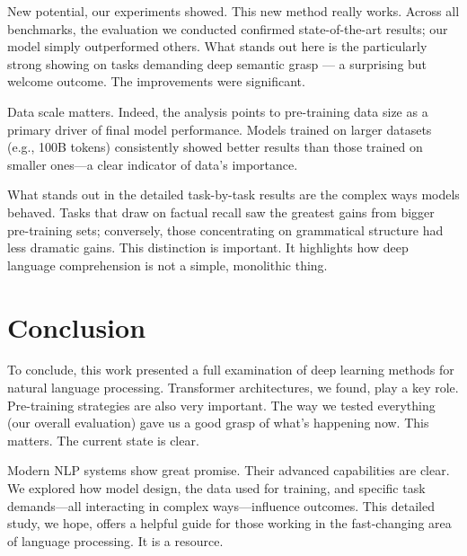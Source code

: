 \documentclass{article}
\begin{document}
New potential, our experiments showed. This new method really works. Across all benchmarks, the evaluation we conducted confirmed state-of-the-art results; our model simply outperformed others. What stands out here is the particularly strong showing on tasks demanding deep semantic grasp — a surprising but welcome outcome. The improvements were significant.

Data scale matters. Indeed, the analysis points to pre-training data size as a primary driver of final model performance. Models trained on larger datasets (e.g., 100B tokens) consistently showed better results than those trained on smaller ones—a clear indicator of data’s importance.

What stands out in the detailed task-by-task results are the complex ways models behaved. Tasks that draw on factual recall saw the greatest gains from bigger pre-training sets; conversely, those concentrating on grammatical structure had less dramatic gains. This distinction is important. It highlights how deep language comprehension is not a simple, monolithic thing.

\section{Conclusion}

To conclude, this work presented a full examination of deep learning methods for natural language processing. Transformer architectures, we found, play a key role. Pre-training strategies are also very important. The way we tested everything (our overall evaluation) gave us a good grasp of what's happening now. This matters. The current state is clear.

Modern NLP systems show great promise. Their advanced capabilities are clear. We explored how model design, the data used for training, and specific task demands—all interacting in complex ways—influence outcomes. This detailed study, we hope, offers a helpful guide for those working in the fast-changing area of language processing. It is a resource.



\end{document}
